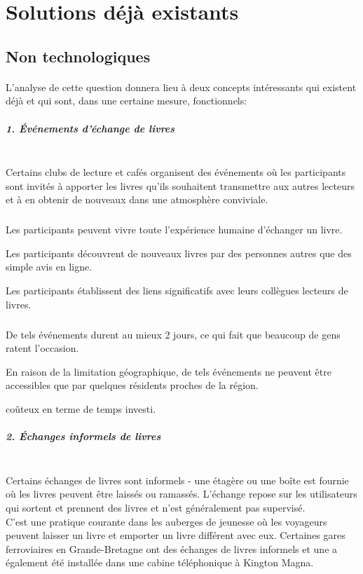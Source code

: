 \section{Solutions déjà existants}

\subsection{Non technologiques}

\paragraph*{}
L'analyse de cette question donnera lieu à deux concepts intéressants qui existent déjà et qui sont, dans une certaine mesure, fonctionnels:

\subparagraph{{\large 1. Événements d'échange de livres}\\\\}
\tab Certains clubs de lecture et cafés organisent des événements où les participants sont invités à apporter les livres qu'ils souhaitent transmettre aux autres lecteurs et à en obtenir de nouveaux dans une atmosphère conviviale.

\subparagraph*{}
\begin{list}{•}{\textbf{Avantages}}
	\item Les participants peuvent vivre toute l'expérience humaine d'échanger un livre.
	\item Les participants découvrent de nouveaux livres par des personnes autres que des simple avis en ligne.
	\item Les participants établissent des liens significatifs avec leurs collègues lecteurs de livres.
\end{list}

\subparagraph*{}
\begin{list}{•}{\textbf{Inconvénients}}
	\item De tels événements durent au mieux 2 jours, ce qui fait que beaucoup de gens ratent l'occasion.
	\item En raison de la limitation géographique, de tels événements ne peuvent être accessibles que par quelques résidents proches de la région.
	\item coûteux en terme de temps investi.
\end{list}

\newpage

\subparagraph{{\large 2. Échanges informels de livres}\\\\}
Certains échanges de livres sont informels - une étagère ou une boîte est fournie où les livres peuvent être laissés ou ramassés. L'échange repose sur les utilisateurs qui sortent et prennent des livres et n'est généralement pas supervisé.\\
\tab C'est une pratique courante dans les auberges de jeunesse où les voyageurs peuvent laisser un livre et emporter un livre différent avec eux. Certaines gares ferroviaires en Grande-Bretagne ont des échanges de livres informels et une a également été installée dans une cabine téléphonique à Kington Magna\cite{noauthor_book_2019}.

